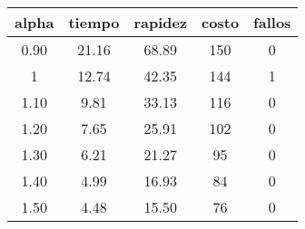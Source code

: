 \begin{table}[h!]
\centering
\begin{tabular}{ccccc}
alpha & tiempo & rapidez & costo & fallos \\ 
\hline 
0.90 & 21.16 & 68.89 & 150 & 0 \\ 
1 & 12.74 & 42.35 & 144 & 1 \\ 
1.10 & 9.81 & 33.13 & 116 & 0 \\ 
1.20 & 7.65 & 25.91 & 102 & 0 \\ 
1.30 & 6.21 & 21.27 & 95 & 0 \\ 
1.40 & 4.99 & 16.93 & 84 & 0 \\ 
1.50 & 4.48 & 15.50 & 76 & 0 \\ 
\hline 
\end{tabular}
\end{table}